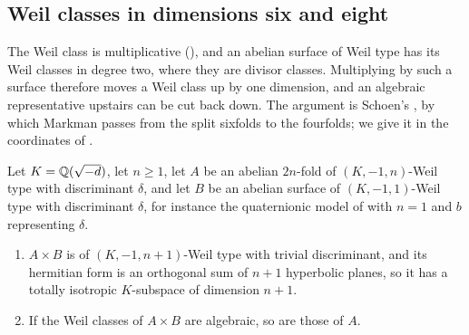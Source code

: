 \subsection{Weil classes in dimensions six and eight}\label{ssec:weilsix}

The Weil class is multiplicative (), and an abelian
surface of Weil type has its Weil classes in degree two, where they are
divisor classes. Multiplying by such a surface therefore moves a Weil class
up by one dimension, and an algebraic representative upstairs can be cut
back down. The argument is Schoen's \cite[Proposition~10]{Sch98}, by which
Markman passes from the split sixfolds to the fourfolds; we give it in the
coordinates of .

\begin{proposition}\label{prop:stabilise}
Let $K=\mathbb{Q}(\sqrt{-d})$, let $n\ge1$, let $A$ be an abelian $2n$-fold of
$(K,-1,n)$-Weil type with discriminant $\delta$, and let $B$ be an abelian
surface of $(K,-1,1)$-Weil type with discriminant $\delta$, for instance the
quaternionic model of  with $n=1$ and $b$ representing
$\delta$.
\begin{enumerate}[label=\textup{(\roman*)},leftmargin=2.6em,itemsep=2pt]
\item $A\times B$ is of $(K,-1,n+1)$-Weil type with trivial discriminant,
  and its hermitian form is an orthogonal sum of $n+1$ hyperbolic planes, so
  it has a totally isotropic $K$-subspace of dimension $n+1$.
\item If the Weil classes of $A\times B$ are algebraic, so are those of $A$.
\end{enumerate}
\end{proposition}

